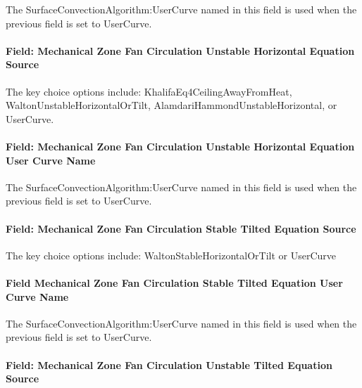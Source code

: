 The SurfaceConvectionAlgorithm:UserCurve named in this field is used when the previous field is set to UserCurve.

\paragraph{Field: Mechanical Zone Fan Circulation Unstable Horizontal Equation Source}\label{field-mechanical-zone-fan-circulation-unstable-horizontal-equation-source}

The key choice options include: KhalifaEq4CeilingAwayFromHeat, WaltonUnstableHorizontalOrTilt, AlamdariHammondUnstableHorizontal, or UserCurve.

\paragraph{Field: Mechanical Zone Fan Circulation Unstable Horizontal Equation User Curve Name}\label{field-mechanical-zone-fan-circulation-unstable-horizontal-equation-user-curve-name}

The SurfaceConvectionAlgorithm:UserCurve named in this field is used when the previous field is set to UserCurve.

\paragraph{Field: Mechanical Zone Fan Circulation Stable Tilted Equation Source}\label{field-mechanical-zone-fan-circulation-stable-tilted-equation-source}

The key choice options include: WaltonStableHorizontalOrTilt or UserCurve

\paragraph{Field Mechanical Zone Fan Circulation Stable Tilted Equation User Curve Name}\label{field-mechanical-zone-fan-circulation-stable-tilted-equation-user-curve-name}

The SurfaceConvectionAlgorithm:UserCurve named in this field is used when the previous field is set to UserCurve.

\paragraph{Field: Mechanical Zone Fan Circulation Unstable Tilted Equation Source}\label{field-mechanical-zone-fan-circulation-unstable-tilted-equation-source}

